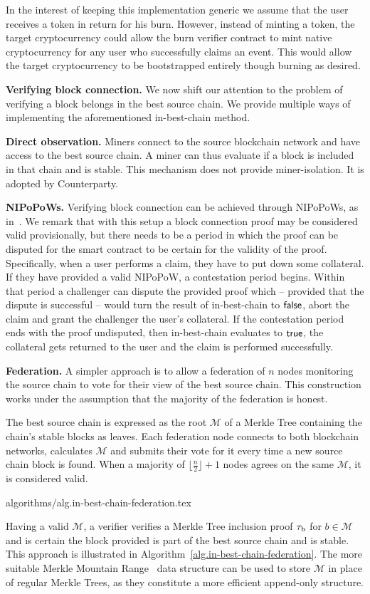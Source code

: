 In the interest of keeping this implementation generic we assume that the user receives a token in return for his burn. However, instead of minting a token, the target cryptocurrency could allow the burn verifier contract to mint native cryptocurrency for any user who successfully claims an event. This would allow the target cryptocurrency to be bootstrapped entirely though burning as desired.

\noindent
\textbf{Verifying block connection.}
We now shift our attention to the problem of verifying a block belongs in the best source chain. We provide multiple ways of implementing the aforementioned \textsf{in-best-chain} method.

\noindent
\textbf{Direct observation.}
Miners connect to the source blockchain network and have access to the best source chain. A miner can thus evaluate if a block is included in that chain and is stable. This mechanism does not provide miner-isolation. It is adopted by Counterparty.

\noindent
\textbf{NIPoPoWs.}
Verifying block connection can be achieved through NIPoPoWs, as in~\cite{pow-sidechains}.
We remark that with this setup a block connection proof may be considered valid provisionally, but there needs to be a period in which the proof can be disputed for the smart contract to be certain for the validity of the proof. Specifically, when a user performs a claim, they have to put down some collateral. If they have provided a valid NIPoPoW, a contestation period begins. Within that period a challenger can dispute the provided proof which -- provided that the dispute is successful -- would turn the result of \textsf{in-best-chain} to $\mathsf{false}$, abort the claim and grant the challenger the user's collateral. If the contestation period ends with the proof undisputed, then \textsf{in-best-chain} evaluates to $\mathsf{true}$, the collateral gets returned to the user and the claim is performed successfully.

\noindent
\textbf{Federation.}
A simpler approach is to allow a federation of $n$ nodes monitoring the source chain to vote for their view of the best source chain. This construction works under the assumption that the majority of the federation is honest.

The best source chain is expressed as the root $\mathcal{M}$ of a Merkle Tree containing the chain's stable blocks as leaves. Each federation node connects to both blockchain networks, calculates $\mathcal{M}$ and submits their vote for it every time a new source chain block is found. When a majority of $\lfloor\frac{n}{2}\rfloor + 1$ nodes agrees on the same $\mathcal{M}$, it is considered valid.

{algorithms/alg.in-best-chain-federation.tex}

Having a valid $\mathcal{M}$, a verifier verifies a Merkle Tree inclusion proof $\tau_\text{b}$ for $b \in \mathcal{M}$ and is certain the block provided is part of the best source chain and is stable. This approach is illustrated in Algorithm~\ref{alg.in-best-chain-federation}. The more suitable Merkle Mountain Range~\cite{flyclient} data structure can be used to store $\mathcal{M}$ in place of regular Merkle Trees, as they constitute a more efficient append-only structure.
